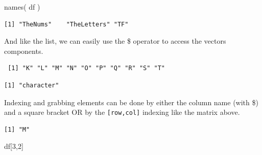 \documentclass[
  letterpaper,
]{book}
\newenvironment{Shaded}{\begin{snugshade}}{\end{snugshade}}
\newcommand{\DecValTok}[1]{\textcolor[rgb]{0.68,0.00,0.00}{#1}}
\newcommand{\FunctionTok}[1]{\textcolor[rgb]{0.28,0.35,0.67}{#1}}
\newcommand{\NormalTok}[1]{\textcolor[rgb]{0.00,0.23,0.31}{#1}}
\newcommand{\SpecialCharTok}[1]{\textcolor[rgb]{0.37,0.37,0.37}{#1}}
\begin{document}
\begin{Shaded}
\begin{Highlighting}[]
\FunctionTok{names}\NormalTok{( df )}
\end{Highlighting}
\end{Shaded}

\begin{verbatim}
[1] "TheNums"    "TheLetters" "TF"        
\end{verbatim}

And like the list, we can easily use the \$ operator to access the
vectors components.

\begin{Shaded}
\end{Shaded}

\begin{verbatim}
 [1] "K" "L" "M" "N" "O" "P" "Q" "R" "S" "T"
\end{verbatim}

\begin{Shaded}
\end{Shaded}

\begin{verbatim}
[1] "character"
\end{verbatim}

Indexing and grabbing elements can be done by either the column name
(with \$) and a square bracket OR by the \texttt{{[}row,col{]}} indexing
like the matrix above.

\begin{Shaded}
\end{Shaded}

\begin{verbatim}
[1] "M"
\end{verbatim}

\begin{Shaded}
\begin{Highlighting}[]
\NormalTok{df[}\DecValTok{3}\NormalTok{,}\DecValTok{2}\NormalTok{]}
\end{Highlighting}
\end{Shaded}
\end{document}
